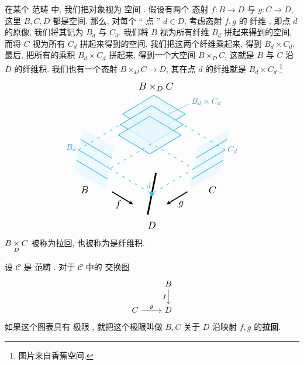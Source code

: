 \begin{example}
    在某个 范畴 中, 我们把对象视为 空间 .
    假设有两个 态射  $f \colon B \to D$ 与 $g \colon C \to D$,
    这里 $B, C, D$ 都是空间.
    那么, 对每个 `` 点 '' $d \in D$,
    考虑态射 $f, g$ 的 纤维 , 即点 $d$ 的原像, 我们将其记为 $B_d$ 与 $C_d$.
    我们将 $B$ 视为所有纤维 $B_d$ 拼起来得到的空间,
    而将 $C$ 视为所有 $C_d$ 拼起来得到的空间.
    我们把这两个纤维乘起来, 得到 $B_d \times C_d$.
    最后, 把所有的乘积 $B_d \times C_d$ 拼起来, 得到一个大空间 $B \times_D C$,
    这就是 $B$ 与 $C$ 沿 $D$ 的纤维积.
    我们也有一个态射 $B \times_D C \to D$,
    其在点 $d$ 的纤维就是 $B_d \times C_d$.\footnote{图片来自香蕉空间.}
    \[\begin{tikzpicture}[scale=.9]
        \draw [line width=2] (0, 0) -- (-.4, -2);
        \fill [cyan!7]
            (-2, 1.2) -- (-2.4, -.8) -- (-3.9, .1) -- (-3.5, 2.1);
        \fill [cyan!7]
            (2, 1.2) -- (1.6, -.8) -- (3.1, .1) -- (3.5, 2.1);
        \foreach \i in {1, ..., 3} {
            \draw [thick, cyan!80] 
                (-3.5 - .1 * \i, 2.1 - .5 * \i) -- (-2 - .1 * \i, 1.2 - .5 * \i)
                (3.5 - .1 * \i, 2.1 - .5 * \i) -- (2 - .1 * \i, 1.2 - .5 * \i);
        }
        \foreach \i in {1, ..., 3} {
            \draw [thick, cyan!80, fill=cyan!10, fill opacity=.75] 
                (-.1 * \i, 4.2 - .5 * \i) -- (1.5 - .1 * \i, 3.3 - .5 * \i) --
                (-.1 * \i, 2.4 - .5 * \i) -- (-1.5 - .1 * \i, 3.3 - .5 * \i) -- cycle;
        }
        \draw [thick, cyan!80, loosely dashed]
            (-2.2, .2) -- (-.2, -1) -- (1.8, .2) -- (-.2, 1.4) -- cycle
            (-3.7, 1.1) -- (-1.7, 2.3)
            (3.3, 1.1) -- (1.3, 2.3);
        \fill [cyan!80] (-.2, -1) circle (.1);
        \draw [line width=1.2, -stealth] (-2.1, -.9) -- (-1.1, -1.5);
        \draw [line width=1.2, -stealth] (1.5, -.9) -- (.5, -1.5);
        \node [cyan!75!black] at (-.35, -.6) {$d$};
        \node [scale=1.2] at (-.2, -2.5) {$D$};
        \node [scale=1.2] at (-3.4, -.8) {$B$};
        \node [scale=1.2] at (2.7, -.8) {$C$};
        \node [scale=1.2] at (-1.8, -1.5) {$f$};
        \node [scale=1.2] at (1.2, -1.5) {$g$};
        \node [scale=1.2] at (0, 4.1) {$B \times_D C$};
        \node [cyan!75!black] at (-4.05, 1.2) {$B_d$};
        \node [cyan!75!black] at (3.65, 1.1) {$C_d$};
        \node [cyan!75!black] at (2.4, 3.4) {$B_d \times C_d$};
        \draw [cyan!75!black] (1.6, 3.3) -- (.6, 2.8);
    \end{tikzpicture}\]
    $B \underset{D}{\times} C$ 被称为拉回, 也被称为是纤维积.
    \begin{definition} [拉回, 纤维积]
    \label{拉回}
    设 $\mathcal{C}$ 是 范畴 .
    对于 $\mathcal{C}$ 中的 交换图
    \[\begin{tikzcd}
	& B \\
	C & D
	\arrow["f"', from=1-2, to=2-2]
	\arrow["g", from=2-1, to=2-2]
    \end{tikzcd}\]
    如果这个图表具有 极限 ,
    就把这个极限叫做 $B, C$ 关于 $D$ 沿映射 $f, g$ 的\textbf{拉回}.


\end{definition}
\end{example}
